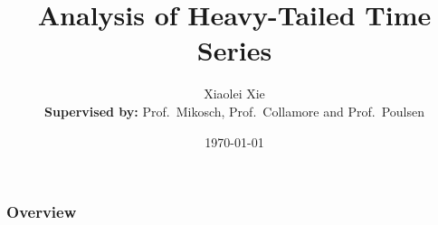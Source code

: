 \documentclass{beamer}
\title{Analysis of Heavy-Tailed Time Series}
\author{
  Xiaolei Xie\\
  \medskip
  {\scriptsize {\bf Supervised by:}  Prof.~Mikosch, Prof.~Collamore and Prof.~Poulsen}
} %
\institute[UCPH] %
{
University of Copenhagen \\ %
\medskip
\textit{xie@math.ku.dk} %
}
\date{\today} %
\begin{document}
\begin{frame}
\titlepage %
\end{frame}



\begin{frame}
\frametitle{Overview}
\tableofcontents
\end{frame}

\end{document}
